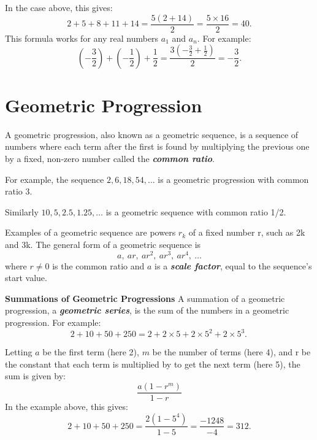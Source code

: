 
In the case above, this gives:
\[2+5+8+11+14={\frac  {5(2+14)}{2}}={\frac  {5\times 16}{2}}=40.\]
This formula works for any real numbers $a_{1}$ and $a_{n}$. For example:
\[\left(-{\frac  {3}{2}}\right)+\left(-{\frac  {1}{2}}\right)+{\frac  {1}{2}}={\frac  {3\left(-{\frac  {3}{2}}+{\frac  {1}{2}}\right)}{2}}=-{\frac  {3}{2}}.\]

\section{Geometric Progression}
A geometric progression, also known as a geometric sequence, is a sequence of numbers where each term after the first is found by multiplying the previous one by a fixed, non-zero number called the \textit{\textbf{common ratio}}. 

\noindent For example, the sequence $2, 6, 18, 54, \ldots$ is a geometric progression with common ratio 3. 

\noindent Similarly $10, 5, 2.5, 1.25, \ldots$ is a geometric sequence with common ratio 1/2.





\noindent Examples of a geometric sequence are powers $r_k$ of a fixed number r, such as 2k and 3k. The general form of a geometric sequence is
\[a,\ ar,\ ar^{2},\ ar^{3},\ ar^{4},\ \ldots \]
where $r \neq 0$ is the common ratio and $a$ is a \textit{\textbf{scale factor}}, equal to the sequence's start value.


\textbf{Summations of Geometric Progressions}
A summation of a geometric progression, a \textit{\textbf{geometric series}}, is the sum of the numbers in a geometric progression. For example:
\[2+10+50+250=2+2\times 5+2\times 5^{2}+2\times 5^{3}.\,\]


Letting $a$ be the first term (here 2), $m$ be the number of terms (here 4), and r be the constant that each term is multiplied by to get the next term (here 5), the sum is given by:
\[{\frac  {a(1-r^{m})}{1-r}}\]
In the example above, this gives:
\[2+10+50+250={\frac  {2(1-5^{4})}{1-5}}={\frac  {-1248}{-4}}=312.\]


